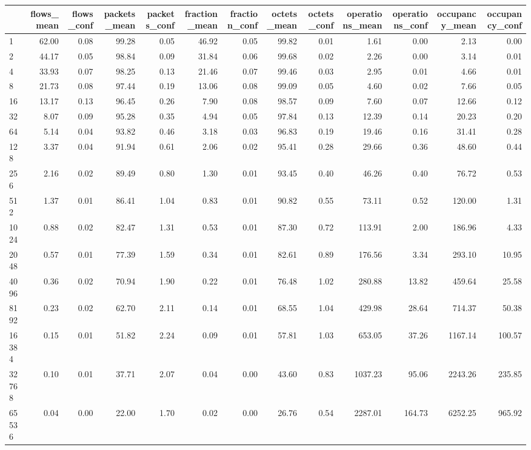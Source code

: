 \begin{tabular}{lrrrrrrrrrrrr}
\toprule
 & flows_mean & flows_conf & packets_mean & packets_conf & fraction_mean & fraction_conf & octets_mean & octets_conf & operations_mean & operations_conf & occupancy_mean & occupancy_conf \\
\midrule
1 & 62.00 & 0.08 & 99.28 & 0.05 & 46.92 & 0.05 & 99.82 & 0.01 & 1.61 & 0.00 & 2.13 & 0.00 \\
2 & 44.17 & 0.05 & 98.84 & 0.09 & 31.84 & 0.06 & 99.68 & 0.02 & 2.26 & 0.00 & 3.14 & 0.01 \\
4 & 33.93 & 0.07 & 98.25 & 0.13 & 21.46 & 0.07 & 99.46 & 0.03 & 2.95 & 0.01 & 4.66 & 0.01 \\
8 & 21.73 & 0.08 & 97.44 & 0.19 & 13.06 & 0.08 & 99.09 & 0.05 & 4.60 & 0.02 & 7.66 & 0.05 \\
16 & 13.17 & 0.13 & 96.45 & 0.26 & 7.90 & 0.08 & 98.57 & 0.09 & 7.60 & 0.07 & 12.66 & 0.12 \\
32 & 8.07 & 0.09 & 95.28 & 0.35 & 4.94 & 0.05 & 97.84 & 0.13 & 12.39 & 0.14 & 20.23 & 0.20 \\
64 & 5.14 & 0.04 & 93.82 & 0.46 & 3.18 & 0.03 & 96.83 & 0.19 & 19.46 & 0.16 & 31.41 & 0.28 \\
128 & 3.37 & 0.04 & 91.94 & 0.61 & 2.06 & 0.02 & 95.41 & 0.28 & 29.66 & 0.36 & 48.60 & 0.44 \\
256 & 2.16 & 0.02 & 89.49 & 0.80 & 1.30 & 0.01 & 93.45 & 0.40 & 46.26 & 0.40 & 76.72 & 0.53 \\
512 & 1.37 & 0.01 & 86.41 & 1.04 & 0.83 & 0.01 & 90.82 & 0.55 & 73.11 & 0.52 & 120.00 & 1.31 \\
1024 & 0.88 & 0.02 & 82.47 & 1.31 & 0.53 & 0.01 & 87.30 & 0.72 & 113.91 & 2.00 & 186.96 & 4.33 \\
2048 & 0.57 & 0.01 & 77.39 & 1.59 & 0.34 & 0.01 & 82.61 & 0.89 & 176.56 & 3.34 & 293.10 & 10.95 \\
4096 & 0.36 & 0.02 & 70.94 & 1.90 & 0.22 & 0.01 & 76.48 & 1.02 & 280.88 & 13.82 & 459.64 & 25.58 \\
8192 & 0.23 & 0.02 & 62.70 & 2.11 & 0.14 & 0.01 & 68.55 & 1.04 & 429.98 & 28.64 & 714.37 & 50.38 \\
16384 & 0.15 & 0.01 & 51.82 & 2.24 & 0.09 & 0.01 & 57.81 & 1.03 & 653.05 & 37.26 & 1167.14 & 100.57 \\
32768 & 0.10 & 0.01 & 37.71 & 2.07 & 0.04 & 0.00 & 43.60 & 0.83 & 1037.23 & 95.06 & 2243.26 & 235.85 \\
65536 & 0.04 & 0.00 & 22.00 & 1.70 & 0.02 & 0.00 & 26.76 & 0.54 & 2287.01 & 164.73 & 6252.25 & 965.92 \\

\end{tabular}

